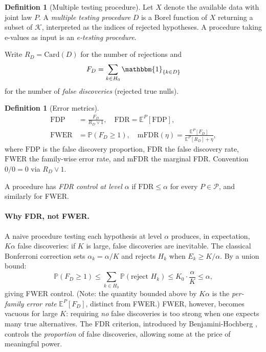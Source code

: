 \documentclass[11pt,a4paper,twocolumn]{article}
\theoremstyle{plain}
\theoremstyle{definition}
\newtheorem{definition}[theorem]{Definition}
\theoremstyle{remark}
\newcommand{\E}{\mathbb{E}}
\newcommand{\Prob}{\mathbb{P}}
\newcommand{\ind}{\mathbbm{1}}
\newcommand{\FDR}{\mathrm{FDR}}
\newcommand{\FDP}{\mathrm{FDP}}
\newcommand{\FWER}{\mathrm{FWER}}
\newcommand{\Card}{\mathrm{Card}}
\begin{document}
\begin{definition}[Multiple testing procedure]
Let $X$ denote the available data with joint law $P$. A \emph{multiple
testing procedure} $D$ is a Borel function of $X$ returning a subset of
$\mathcal{K}$, interpreted as the indices of rejected hypotheses. A procedure
taking e-values as input is an \emph{e-testing procedure}.
\end{definition}

Write $R_D = \Card(D)$ for the number of rejections and
\[
  F_D = \sum_{k \in H_0} \ind_{\{k \in D\}}
\]
for the number of \emph{false discoveries} (rejected true nulls).

\begin{definition}[Error metrics]
\begin{align*}
  \FDP &= \frac{F_D}{R_D \vee 1},\quad
  \FDR = \E^P[\FDP],\\
  \FWER &= \Prob(F_D \geq 1),\quad
  \mathrm{mFDR}(\eta) = \tfrac{\E^P[F_D]}{\E^P[R_D]+\eta},
\end{align*}
where $\FDP$ is the false discovery proportion, $\FDR$ the false discovery
rate, $\FWER$ the family-wise error rate, and $\mathrm{mFDR}$ the marginal
FDR. Convention $0/0 = 0$ via $R_D \vee 1$.

A procedure has \emph{FDR control at level $\alpha$} if $\FDR \leq \alpha$
for every $P \in \mathcal{P}$, and similarly for FWER.
\end{definition}

\paragraph{Why FDR, not FWER.}
A naive procedure testing each hypothesis at level $\alpha$ produces, in
expectation, $K\alpha$ false discoveries: if $K$ is large, false discoveries
are inevitable. The classical Bonferroni correction sets $\alpha_k = \alpha/K$
and rejects $H_k$ when $E_k \geq K/\alpha$. By a union bound:
\[
  \Prob(F_D \geq 1)
    \leq \sum_{k \in H_0} \Prob(\text{reject } H_k)
    \leq K_0 \cdot \frac{\alpha}{K}
    \leq \alpha,
\]
giving FWER control. (Note: the quantity bounded above by $K\alpha$ is the
\emph{per-family error rate} $\E^P[F_D]$, distinct from FWER.) FWER, however,
becomes vacuous for large $K$: requiring \emph{no} false discoveries is too
strong when one expects many true alternatives. The FDR criterion, introduced
by Benjamini-Hochberg \cite{BH1995}, controls the \emph{proportion} of false
discoveries, allowing some at the price of meaningful power.
\end{document}
